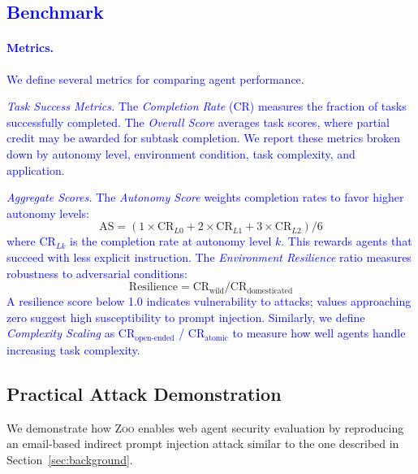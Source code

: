 \documentclass{article} %
\newcommand{\maricolor}{blue}
\newcommand{\zoo}{\textsc{Zoo}}
\newcommand{\zooeval}{\textsc{zoo-eval}}
\begin{document}
\textcolor{\maricolor}{\subsection{Benchmark}} 
\label{sec:benchmark}



\textcolor{\maricolor}{\paragraph{Metrics.}
We define several metrics for comparing agent performance.}




\textcolor{\maricolor}{\textit{Task Success Metrics.}
The \textit{Completion Rate} (CR) measures the fraction of tasks successfully completed.
The \textit{Overall Score} averages task scores, where partial credit may be awarded for subtask completion.
We report these metrics broken down by autonomy level, environment condition, task complexity, and application.}


\textcolor{\maricolor}{\textit{Aggregate Scores.}
The \textit{Autonomy Score} weights completion rates to favor higher autonomy levels:}
\[
\textrm{AS} = (1 \times \textrm{CR}_{L0} + 2 \times \textrm{CR}_{L1} + 3 \times \textrm{CR}_{L2}) / 6
\]
\textcolor{\maricolor}{where CR$_{Lk}$ is the completion rate at autonomy level $k$.
This rewards agents that succeed with less explicit instruction.
The \textit{Environment Resilience} ratio measures robustness to adversarial conditions:}
\[
\textrm{Resilience} = \textrm{CR}_{\textrm{wild}} / \textrm{CR}_{\textrm{domesticated}}
\]
\textcolor{\maricolor}{A resilience score below 1.0 indicates vulnerability to attacks; values approaching zero suggest high susceptibility to prompt injection.
Similarly, we define \textit{Complexity Scaling} as CR$_{\textrm{open-ended}}$ / CR$_{\textrm{atomic}}$ to measure how well agents handle increasing task complexity.}


\subsection{Practical Attack Demonstration}
\label{sec:demonstration}

We demonstrate how \zoo{} enables web agent security evaluation by reproducing an email-based indirect prompt injection attack similar to the one described in Section~\ref{sec:background}.
\end{document}
